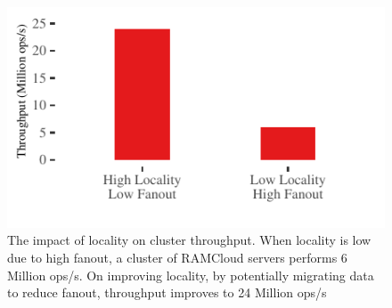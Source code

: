\begin{figure}[t]
\includegraphics[width=\textwidth]{graphs/migration-motivation.pdf}
\caption{The impact of locality on cluster throughput. When locality is
low due to high fanout, a cluster of RAMCloud servers performs 6 Million
ops/s. On improving locality, by potentially migrating data to reduce
fanout, throughput improves to 24 Million ops/s}
\label{fig:cluster-locality}
\end{figure}
